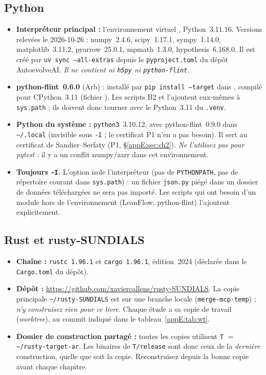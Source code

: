 \subsection{Python}
\begin{itemize}
\item \textbf{Interpréteur principal :} l'environnement virtuel , Python~3.11.16. Versions
relevées le 2026-10-26 : numpy~2.4.6, scipy~1.17.1, sympy~1.14.0, matplotlib~3.11.2, pyarrow~25.0.1, mpmath~1.3.0,
hypothesis~6.168.0. Il est créé par \texttt{uv sync --all-extras} depuis le \texttt{pyproject.toml} du dépôt
AutoevolveAI. \emph{Il ne contient ni \texttt{h5py} ni \texttt{python-flint}.}
\item \textbf{python-flint~0.6.0} (Arb) : installé par \texttt{pip install --target} dans ,
compilé pour CPython~3.11 (fichier ). Les scripts B2 et
 l'ajoutent eux-mêmes à \texttt{sys.path} ; ils doivent donc tourner avec le Python~3.11
du \texttt{.venv}.
\item \textbf{Python du système :} \texttt{python3}~3.10.12, avec python-flint~0.9.0 dans \texttt{\~{}/.local} (invisible sous \texttt{-I} ; le certificat P1 n'en a pas besoin). Il sert au
certificat de Sandier--Serfaty (P1, §\ref{appE:sec:ch2}). \emph{Ne l'utilisez pas pour pytest} : il y a un conflit
numpy/zarr dans cet environnement.
\item \textbf{Toujours \texttt{-I}.} L'option isole l'interpréteur (pas de \texttt{PYTHONPATH}, pas de répertoire
courant dans \texttt{sys.path}) : un fichier \texttt{json.py} piégé dans un dossier de données téléchargées ne sera pas
importé. Les scripts qui ont besoin d'un module hors de l'environnement (LeanFlow, python-flint) l'ajoutent
explicitement.
\end{itemize}

\subsection{Rust et rusty-SUNDIALS}
\begin{itemize}
\item \textbf{Chaîne :} \texttt{rustc~1.96.1} et \texttt{cargo~1.96.1}, édition~2024 (déclarée dans le
\texttt{Cargo.toml} du dépôt).
\item \textbf{Dépôt :} \url{https://github.com/xaviercallens/rusty-SUNDIALS}. La copie principale
\texttt{\~{}/rusty-SUNDIALS} est sur une branche locale (\texttt{merge-mcp-temp}) ; \emph{n'y construisez rien pour ce
livre}. Chaque étude a sa copie de travail (\emph{worktree}), au commit indiqué dans le tableau~\ref{appE:tab:wt}.
\item \textbf{Dossier de construction partagé :} toutes les copies utilisent \texttt{T} $=$ \texttt{\~{}/rusty-target-ar}.
Les binaires de \texttt{T/release} sont donc ceux de la \emph{dernière} construction, quelle que soit la copie.
Reconstruisez depuis la bonne copie avant chaque chapitre.
\end{itemize}

